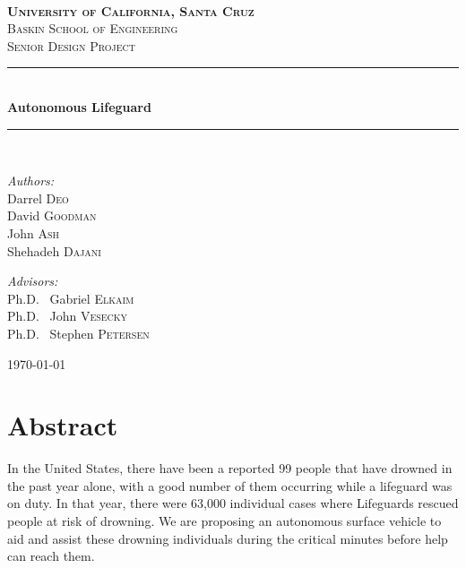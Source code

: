 \documentclass[11pt]{article}
\newcommand{\HRule}{\rule{\linewidth}{0.5mm}}
\begin{document}
\begin{titlepage}
\begin{center}

\ \\[5.6cm]
\textsc{\LARGE \textbf{University of California, Santa Cruz} \\Baskin School of Engineering}\\[1.5cm]

\textsc{\Large Senior Design Project}\\[0.5cm]

\HRule \\[0.4cm]
{ \huge \bfseries Autonomous Lifeguard}\\[0.4cm]

\HRule \\[1.5cm]

\begin{minipage}{0.4\textwidth}
\begin{flushleft} \large
\emph{Authors:}\\
Darrel \textsc{Deo}\\
David \textsc{Goodman}\\
John \textsc{Ash}\\
Shehadeh \textsc{Dajani}
\end{flushleft}
\end{minipage}
\begin{minipage}{0.4\textwidth}
\begin{flushright} \large
\emph{Advisors:} \\
Ph.D. ~Gabriel \textsc{Elkaim}\\
Ph.D. ~John \textsc{Vesecky}\\
Ph.D. ~Stephen \textsc{Petersen}
\end{flushright}
\end{minipage}

\vfill

{\large \today}

\end{center}
\end{titlepage}


\section*{Abstract}
In the United States, there have been a reported 99 people that have drowned in the past year alone, with a good number of them occurring while a lifeguard was on duty. In that year, there were 63,000 individual cases where Lifeguards rescued people at risk of drowning. We are proposing an autonomous surface vehicle to aid and assist these drowning individuals during the critical minutes before help can reach them.\\
\end{document}
